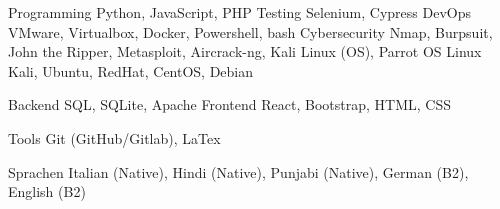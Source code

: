 

\begin{cvskills}

  \cvskill
    {Programming} %
    {Python, JavaScript, PHP} %
  \cvskill
    {Testing} %
    {Selenium, Cypress} %
  \cvskill
    {DevOps} %
    {VMware, Virtualbox, Docker, Powershell, bash} %
  \cvskill
    {Cybersecurity} %
    {Nmap, Burpsuit, John the Ripper, Metasploit, Aircrack-ng, Kali Linux (OS), Parrot OS } %
	  \cvskill
    {Linux} %
    {Kali, Ubuntu, RedHat, CentOS, Debian} %

  \cvskill
    {Backend} %
    {SQL, SQLite, Apache} %
      \cvskill
    {Frontend} %
    {React, Bootstrap, HTML, CSS} %

  \cvskill
    {Tools} %
    {Git (GitHub/Gitlab), LaTex} %

  \cvskill
    {Sprachen} %
    {Italian (Native), Hindi (Native), Punjabi (Native), German (B2), English (B2)} %


\end{cvskills}
